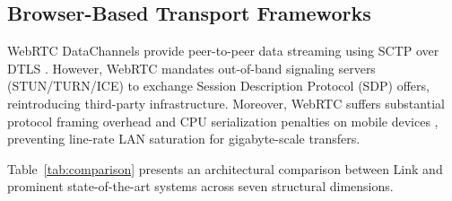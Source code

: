 \documentclass[conference]{IEEEtran}
\begin{document}
\subsection{Browser-Based Transport Frameworks}
WebRTC DataChannels provide peer-to-peer data streaming using SCTP over DTLS \cite{wang2024quicpan}. However, WebRTC mandates out-of-band signaling servers (STUN/TURN/ICE) to exchange Session Description Protocol (SDP) offers, reintroducing third-party infrastructure. Moreover, WebRTC suffers substantial protocol framing overhead and CPU serialization penalties on mobile devices \cite{varangot2026survey}, preventing line-rate LAN saturation for gigabyte-scale transfers.

Table~\ref{tab:comparison} presents an architectural comparison between Link and prominent state-of-the-art systems across seven structural dimensions.

\begin{table}[t]
\caption{Architectural Comparison with State-of-the-Art Systems}
\label{tab:comparison}
\centering
{}
\end{table}
\end{document}
